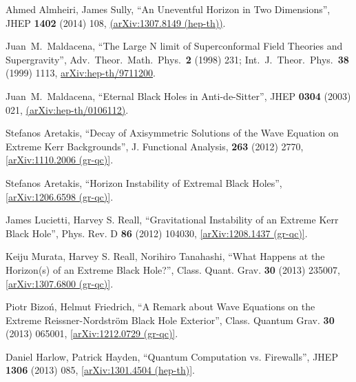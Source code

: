 \documentclass[12pt]{article}
\newcommand{\2}{$^2$}
\newcommand{\3}{$^3$}
\newcommand{\4}{$_4$}
\newcommand{\5}{$_5$}
\begin{document}
\begin{thebibliography}{400}
Ahmed Almheiri, James Sully, ``An Uneventful Horizon in Two Dimensions'',
  JHEP {\bf 1402} (2014) 108, \href{http://arxiv.org/abs/1307.8149}{
  (arXiv:1307.8149 (hep-th))}.

  Juan~M.~Maldacena,
  ``The Large N limit of Superconformal Field Theories and Supergravity'',
  Adv.\ Theor.\ Math.\ Phys.\  {\bf 2} (1998) 231;  Int.\ J.\ Theor.\ Phys.\  {\bf 38} (1999) 1113,
 \href{http://arxiv.org/abs/hep-th/9711200}{arXiv:hep-th/9711200}.

  Juan~M.~Maldacena,
  ``Eternal Black Holes in Anti-de-Sitter'',
  JHEP {\bf 0304} (2003) 021, \href{http://arxiv.org/abs/hep-th/0106112}{
  (arXiv:hep-th/0106112)}.







Stefanos Aretakis, ``Decay of Axisymmetric Solutions of the Wave Equation on Extreme Kerr Backgrounds'', J. Functional Analysis, \textbf{263} (2012) 2770, \href{http://arxiv.org/abs/1110.2006}{[arXiv:1110.2006 (gr-qc)]}.

Stefanos Aretakis, ``Horizon Instability of Extremal Black Holes'', \href{http://arxiv.org/abs/1206.6598}{[arXiv:1206.6598 (gr-qc)]}.

James Lucietti, Harvey S. Reall, ``Gravitational Instability of an Extreme Kerr Black Hole'', Phys. Rev. D \textbf{86} (2012) 104030, \href{http://arxiv.org/abs/1208.1437}{[arXiv:1208.1437 (gr-qc)]}.

Keiju Murata, Harvey S. Reall, Norihiro Tanahashi, ``What Happens at the Horizon(s) of an Extreme Black Hole?'', Class. Quant. Grav. \textbf{30} (2013) 235007, \href{http://arxiv.org/abs/1307.6800}{[arXiv:1307.6800 (gr-qc)]}.

Piotr Bizo\'n, Helmut Friedrich, ``A Remark about Wave Equations on the Extreme Reissner-Nordström Black Hole Exterior'', Class. Quantum Grav. \textbf{30} (2013) 065001, \href{http://arxiv.org/abs/1212.0729}{[arXiv:1212.0729 (gr-qc)]}.

Daniel Harlow, Patrick Hayden, ``Quantum Computation vs. Firewalls'', JHEP \textbf{1306} (2013) 085, \href{http://arxiv.org/abs/1301.4504}{[arXiv:1301.4504 (hep-th)]}.


\end{thebibliography}
\end{document}
